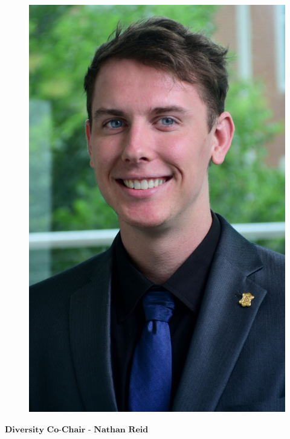 \setlength\intextsep{0pt}
\begin{figure}
	\begin{center}
		\vspace{-\baselineskip}
		\includegraphics[height=15\baselineskip]{ncreid2.jpg}
	\end{center}
\end{figure}
$\textbf{Diversity Co-Chair - Nathan Reid}$\\
